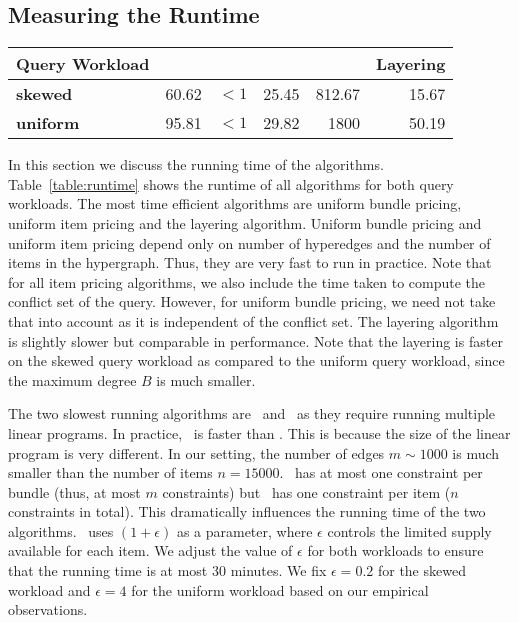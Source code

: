 \subsection{Measuring the Runtime}

\begin{table*}[] \centering
	\begin{small}
		\begin{tabular}{@{}lrrrrr@{}}\toprule
			\textbf{Query Workload} & \textbf{\lpip} & \textbf{\ubp} & \textbf{\uip} & \textbf{\cip} & \textbf{Layering}  \\ \midrule
			
			\textbf{skewed} &  60.62 & $< 1$ & 25.45 & 812.67 & 15.67 \\ \hdashline
			\textbf{uniform} &  95.81 & $< 1$ &  29.82 &1800 & 50.19 \\
			\bottomrule
		\end{tabular}
	\end{small}
	\caption{Algorithm running times (in seconds) for different workloads.}
	\label{table:runtime}
\end{table*}

In this section we discuss the running time of the algorithms. Table~\ref{table:runtime} shows the runtime of all algorithms for both query workloads. The most time efficient algorithms are uniform bundle pricing, uniform item pricing and the layering algorithm. Uniform bundle pricing and uniform item pricing depend only on number of hyperedges and the number of items in the hypergraph. Thus, they are very fast to run in practice. Note that for all item pricing algorithms, we also include the time taken to compute the conflict set of the query. However, for uniform bundle pricing, we need not take that into account as it is independent of the conflict set. The layering algorithm is slightly slower but comparable in performance. Note that the layering is faster on the skewed query workload as compared to the uniform query workload, since the maximum degree $B$ is much smaller. 

The two slowest running algorithms are \lpip\ and \cip\ as they require running multiple linear programs. In practice, \lpip\ is faster than \cip. This is because the size of the linear program is very different. In our setting, the number of edges $m \sim 1000$ is much smaller than the number of items $n = 15000$. \lpip\  has at most one constraint per bundle (thus, at most $m$ constraints) but \cip\ has one constraint per item ($n$ constraints in total). This dramatically influences the running time of the two algorithms. \cip\ uses $(1+\epsilon)$ as a parameter, where $\epsilon$ controls the limited supply available for each item. We adjust the value of $\epsilon$ for both workloads to ensure that the running time is at most $30$ minutes. We fix $\epsilon = 0.2$ for the skewed workload and $\epsilon = 4$ for the uniform workload based on our empirical observations.


